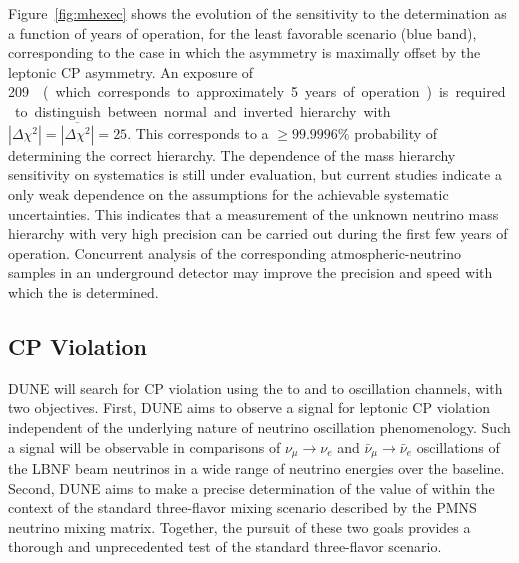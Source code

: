 Figure~\ref{fig:mhexec} shows the evolution of the sensitivity to the  determination as a function
of years of operation, for the least favorable scenario (blue band), corresponding to the case in which the  asymmetry is
maximally offset by the leptonic CP asymmetry. An exposure of \SI{209}~\ktMWyr{}  
(which corresponds to approximately \num{5} years of operation) is required to distinguish
between normal and inverted hierarchy with $|\Delta \chi^2| =
\overline{|\Delta \chi^2|} = 25$.  This corresponds to a $\geq
99.9996\%$ probability of determining the correct hierarchy. 
The dependence of the mass
hierarchy sensitivity on systematics is still under evaluation, but
current studies indicate a only weak dependence on the assumptions for 
the achievable systematic uncertainties. This indicates that a measurement of the unknown
neutrino mass hierarchy with very high precision can be carried out
during the first few years of operation.
Concurrent analysis of the corresponding atmospheric-neutrino
samples in an underground detector may improve the precision and
speed with which the  is determined.

\subsection{CP Violation}

DUNE will search for CP violation using the \numu to \nue and \anumu
to \anue oscillation channels, with two objectives.  First, DUNE aims
to observe a signal for leptonic CP violation independent of the
underlying nature of neutrino oscillation phenomenology. Such a signal
will be observable in comparisons of $\nu_\mu \rightarrow \nu_e$ and
$\bar{\nu}_{\mu} \rightarrow \bar{\nu}_e$ oscillations of the LBNF
beam neutrinos in a wide range of neutrino energies over the
 baseline.
Second,
DUNE aims to make a precise determination of the value of \deltacp
within the context of the standard three-flavor mixing scenario
described by the PMNS neutrino mixing matrix. Together, the pursuit of
these two goals provides a thorough and unprecedented test of the standard three-flavor
scenario.

